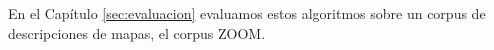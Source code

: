 En el Cap\'itulo \ref{sec:evaluacion} evaluamos estos algoritmos sobre un corpus de descripciones de mapas, el corpus ZOOM.
%

